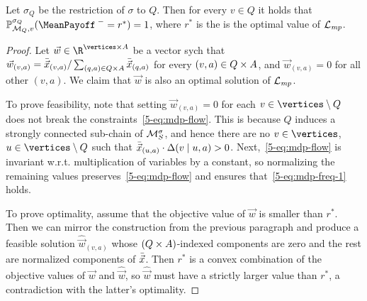 \begin{theorem}
\label{5-cor:mp-scc-optimality}
Let $\sigma_Q$ be the restriction of $\sigma$ to $Q$. Then for every $v\in Q$ it holds that $\probm^{\sigma_Q}_{\mdp_Q,v}(\MeanPayoffInf = r^*)=1$, where $r^*$ is the is the optimal value of $\mathcal{L}_{\mathit{mp}}$. 
\end{theorem}
\begin{proof}
Let $ \vec{w}\in\R^{\vertices \times\actions} $ be a vector sych that $\vec{w}_{(v,a)}=\bar{\vec{x}}_{(v,a)}/\sum_{(q,a)\in Q\times A} \bar{\vec{x}}_{(q,a)}$ for every $(v,a)\in Q\times A$, and $\vec{w}_{(v,a)}=0$ for all other $(v,a)$. We claim that $ \vec{w} $ is also an optimal solution of $\mathcal{L}_{\mathit{mp}}$. 

To prove feasibility, note that setting $\vec{w}_{(v,a)}=0$ for each $v\in \vertices\setminus Q$ does not break the constraints~\cref{5-eq:mdp-flow}. This is because $Q$ induces a strongly connected sub-chain of $\mathcal{M}_{S}^{\sigma}$, and hence there are no $v\in \vertices$, $u\in \vertices\setminus Q$ such that $\bar{\vec{x}}_{(u,a)}\cdot \Delta(v\mid u,a)>0$. Next,~\cref{5-eq:mdp-flow} is invariant w.r.t. multiplication of variables by a constant, so normalizing the remaining values preserves~\cref{5-eq:mdp-flow} and ensures that~\cref{5-eq:mdp-freq-1} holds. 

To prove optimality, assume that the objective value of $\vec{w}$ is smaller than $r^*$. Then we can mirror the construction from the previous paragraph and produce a feasible solution ${\hat{\vec{w}}_{(v,a)}}$ whose $(Q\times A)$-indexed components are zero and the rest are normalized components of $\bar{\vec{x}}$. Then $r^*$ is a convex combination of the objective values of $\vec{w}$ and $\hat{\vec{w}}$, so $\hat{\vec{w}}$ must have a strictly larger value than $r^*$, a contradiction with the latter's optimality.


\end{proof}
